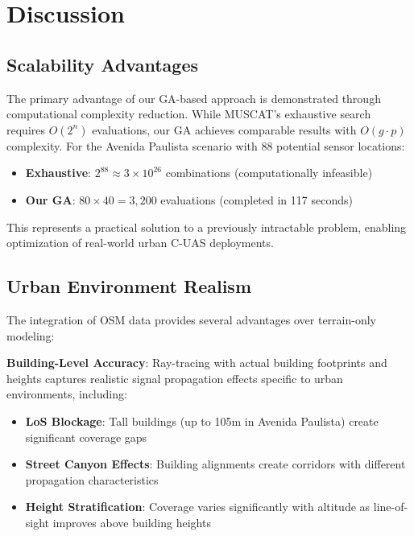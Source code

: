 
\section{Discussion}

\subsection{Scalability Advantages}

The primary advantage of our GA-based approach is demonstrated through computational complexity reduction. While MUSCAT's exhaustive search requires $O(2^n)$ evaluations, our GA achieves comparable results with $O(g \cdot p)$ complexity. For the Avenida Paulista scenario with 88 potential sensor locations:

\begin{itemize}
\item \textbf{Exhaustive}: $2^{88} \approx 3 \times 10^{26}$ combinations (computationally infeasible)
\item \textbf{Our GA}: $80 \times 40 = 3,200$ evaluations (completed in 117 seconds)
\end{itemize}

This represents a practical solution to a previously intractable problem, enabling optimization of real-world urban C-UAS deployments.

\subsection{Urban Environment Realism}

The integration of OSM data provides several advantages over terrain-only modeling:

\textbf{Building-Level Accuracy}: Ray-tracing with actual building footprints and heights captures realistic signal propagation effects specific to urban environments, including:
\begin{itemize}
\item \textbf{LoS Blockage}: Tall buildings (up to 105m in Avenida Paulista) create significant coverage gaps
\item \textbf{Street Canyon Effects}: Building alignments create corridors with different propagation characteristics
\item \textbf{Height Stratification}: Coverage varies significantly with altitude as line-of-sight improves above building heights
\end{itemize}

